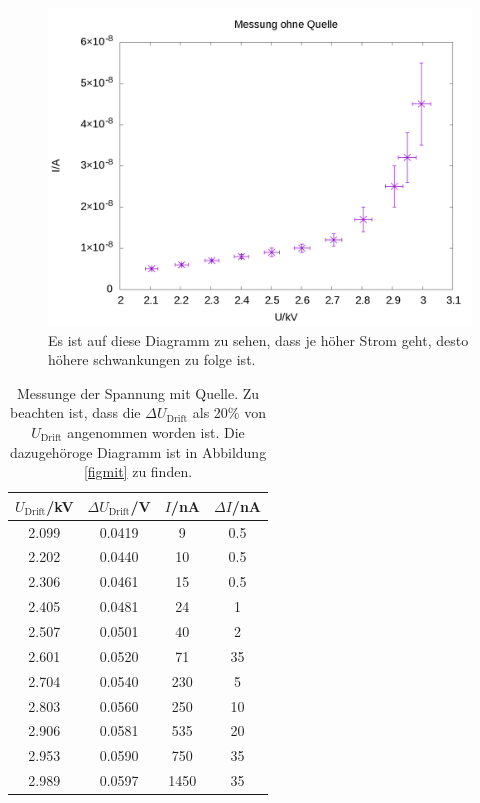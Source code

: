 \documentclass[12pt,ngerman]{article}
\begin{document}
\begin{figure}[htbp]
\centering
\includegraphics[width=0.45\textheight]{ohne.png}
\caption{ Es ist auf diese Diagramm zu sehen, dass je höher Strom geht, desto höhere schwankungen zu folge ist.}
\label{figohne}
\end{figure}
\begin{table}[h]
	\centering
	\begin{tabular}{c c c c}
		$U_{\text{Drift}}$/kV& $\Delta U_{\text{Drift}}$/V&$I$/nA&$\Delta I$/nA\\\hline
	2.099&	0.0419&	9&	0.5\\
	2.202&	0.0440&	10&	0.5\\
	2.306&	0.0461&	15&	0.5\\
	2.405&	0.0481&	24&	1\\
	2.507&	0.0501&	40&	2\\
	2.601&	0.0520&	71&	35\\
	2.704&	0.0540&	230&	5\\
	2.803&  0.0560&	250&	10\\
	2.906&	0.0581&	535&	20\\
	2.953&	0.0590&	750&	35\\
	2.989&	0.0597&	1450&	35\\
	\end{tabular}
	\caption{Messunge der Spannung mit Quelle. Zu beachten ist, dass die $\Delta U_{\text{Drift}}$ als 20\% von $U_{\text{Drift}}$ angenommen worden ist. Die dazugehöroge Diagramm ist in Abbildung \ref{figmit} zu finden.}
\end{table}
\end{document}
